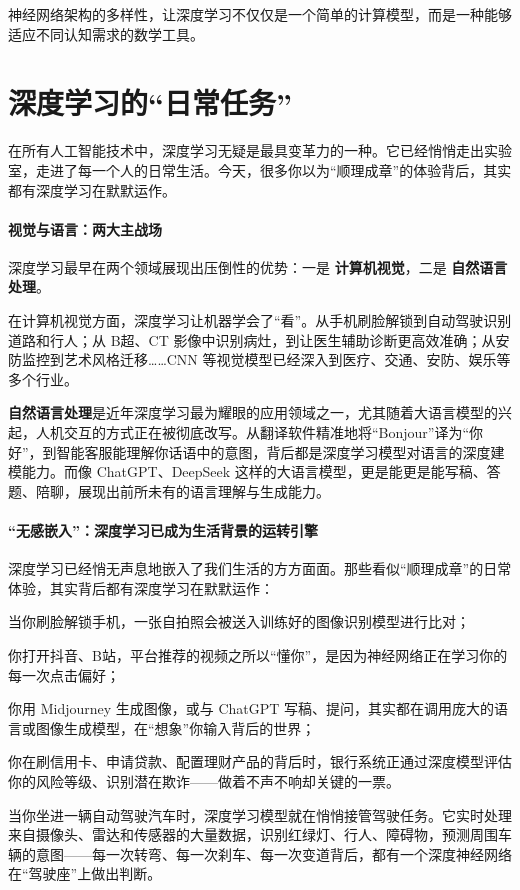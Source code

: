 神经网络架构的多样性，让深度学习不仅仅是一个简单的计算模型，而是一种能够适应不同认知需求的数学工具。

\section{深度学习的“日常任务”}
在所有人工智能技术中，深度学习无疑是最具变革力的一种。它已经悄悄走出实验室，走进了每一个人的日常生活。今天，很多你以为“顺理成章”的体验背后，其实都有深度学习在默默运作。

\paragraph{视觉与语言：两大主战场}
深度学习最早在两个领域展现出压倒性的优势：一是 {\bf 计算机视觉}，二是 {\bf 自然语言处理}。

在计算机视觉方面，深度学习让机器学会了“看”。从手机刷脸解锁到自动驾驶识别道路和行人；从 B超、CT 影像中识别病灶，到让医生辅助诊断更高效准确；从安防监控到艺术风格迁移……CNN 等视觉模型已经深入到医疗、交通、安防、娱乐等多个行业。

 {\bf 自然语言处理}是近年深度学习最为耀眼的应用领域之一，尤其随着大语言模型的兴起，人机交互的方式正在被彻底改写。从翻译软件精准地将“Bonjour”译为“你好”，到智能客服能理解你话语中的意图，背后都是深度学习模型对语言的深度建模能力。而像 ChatGPT、DeepSeek 这样的大语言模型，更是能更是能写稿、答题、陪聊，展现出前所未有的语言理解与生成能力。
 
 \paragraph{“无感嵌入”：深度学习已成为生活背景的运转引擎}
深度学习已经悄无声息地嵌入了我们生活的方方面面。那些看似“顺理成章”的日常体验，其实背后都有深度学习在默默运作：

当你刷脸解锁手机，一张自拍照会被送入训练好的图像识别模型进行比对；

你打开抖音、B站，平台推荐的视频之所以“懂你”，是因为神经网络正在学习你的每一次点击偏好；

你用 Midjourney 生成图像，或与 ChatGPT 写稿、提问，其实都在调用庞大的语言或图像生成模型，在“想象”你输入背后的世界；

你在刷信用卡、申请贷款、配置理财产品的背后时，银行系统正通过深度模型评估你的风险等级、识别潜在欺诈——做着不声不响却关键的一票。

当你坐进一辆自动驾驶汽车时，深度学习模型就在悄悄接管驾驶任务。它实时处理来自摄像头、雷达和传感器的大量数据，识别红绿灯、行人、障碍物，预测周围车辆的意图——每一次转弯、每一次刹车、每一次变道背后，都有一个深度神经网络在“驾驶座”上做出判断。


